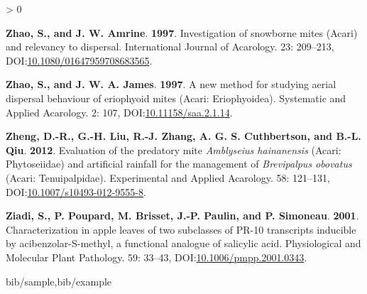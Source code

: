 \documentclass[12pt,final,CPage]{ufthesis}
\newlength{\cslhangindent}
\newenvironment{CSLReferences}[2] %
{%
	\setlength{\parindent}{0pt}
	\ifodd #1 \everypar{\setlength{\hangindent}{\cslhangindent}}\ignorespaces\fi
	\ifnum #2 > 0
	\setlength{\parskip}{#2\baselineskip}
	\fi
}%
{}
\begin{document}
{\begin{CSLReferences}{1}{0}
  \leavevmode{}%
  \textbf{Zhao, S., and J. W. Amrine}. \textbf{1997}. Investigation of snowborne mites ({Acari}) and relevancy to dispersal. International Journal of Acarology. 23: 209--213, DOI:\href{https://doi.org/10.1080/01647959708683565}{10.1080/01647959708683565}.

  \leavevmode{}%
  \textbf{Zhao, S., and J. W. A. James}. \textbf{1997}. A new method for studying aerial dispersal behaviour of eriophyoid mites ({Acari}: {Eriophyoidea}). Systematic and Applied Acarology. 2: 107, DOI:\href{https://doi.org/10.11158/saa.2.1.14}{10.11158/saa.2.1.14}.

  \leavevmode{}%
  \textbf{Zheng, D.-R., G.-H. Liu, R.-J. Zhang, A. G. S. Cuthbertson, and B.-L. Qiu}. \textbf{2012}. Evaluation of the predatory mite {\emph{Amblyseius hainanensis}} ({Acari}: {Phytoseiidae}) and artificial rainfall for the management of {\emph{Brevipalpus obovatus}} ({Acari}: {Tenuipalpidae}). Experimental and Applied Acarology. 58: 121--131, DOI:\href{https://doi.org/10.1007/s10493-012-9555-8}{10.1007/s10493-012-9555-8}.

  \leavevmode{}%
  \textbf{Ziadi, S., P. Poupard, M. Brisset, J.-P. Paulin, and P. Simoneau}. \textbf{2001}. Characterization in apple leaves of two subclasses of {PR}-10 transcripts inducible by acibenzolar-{S}-methyl, a functional analogue of salicylic acid. Physiological and Molecular Plant Pathology. 59: 33--43, DOI:\href{https://doi.org/10.1006/pmpp.2001.0343}{10.1006/pmpp.2001.0343}.

  \end{CSLReferences}
 {bib/sample,bib/example}

\end{document}

